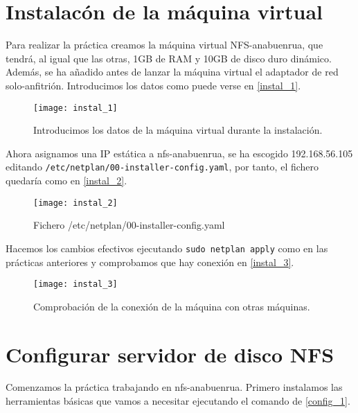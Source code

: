 
\chapter{Instalacón de la máquina virtual}

Para realizar la práctica creamos la máquina virtual NFS-anabuenrua, que tendrá, al igual que las otras, 1GB de RAM y 10GB de disco duro dinámico. Además, se ha añadido antes de lanzar la máquina virtual el adaptador de red solo-anfitrión. Introducimos los datos como puede verse en \eqref{instal_1}.

\begin{figure}[h!]
\begin{center}
\caption{Introducimos los datos de la máquina virtual durante la instalación.}
\label{instal_1}
\texttt{[image: instal\_1]}
\end{center}
\end{figure}

Ahora asignamos una IP estática a nfs-anabuenrua, se ha escogido 192.168.56.105 editando \verb|/etc/netplan/00-installer-config.yaml|, por tanto, el fichero quedaría como en \eqref{instal_2}.

\begin{figure}[h!]
\begin{center}
\caption{Fichero /etc/netplan/00-installer-config.yaml}
\label{instal_2}
\texttt{[image: instal\_2]}
\end{center}
\end{figure}

Hacemos los cambios efectivos ejecutando \verb|sudo netplan apply| como en las prácticas anteriores y comprobamos que hay conexión en \eqref{instal_3}.

\begin{figure}[h!]
\begin{center}
\caption{Comprobación de la conexión de la máquina con otras máquinas.}
\label{instal_3}
\texttt{[image: instal\_3]}
\end{center}
\end{figure}

\chapter{Configurar servidor de disco NFS}

Comenzamos la práctica trabajando en nfs-anabuenrua. Primero instalamos las herramientas básicas que vamos a necesitar ejecutando el comando de \eqref{config_1}.

